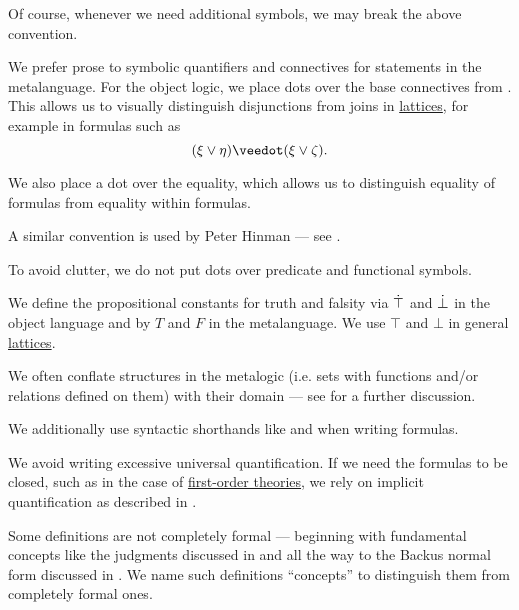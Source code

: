\begin{remark}
\begin{thmenum}
    Of course, whenever we need additional symbols, we may break the above convention.

     We prefer prose to symbolic quantifiers and connectives for statements in the metalanguage. For the object logic, we place dots over the base connectives from . This allows us to visually distinguish disjunctions from joins in \hyperref[def:lattice]{lattices}, for example in formulas such as
    \begin{equation*}
      (\xi \vee \eta) \synvee (\xi \vee \zeta).
    \end{equation*}

    We also place a dot over the equality, which allows us to distinguish equality of formulas from equality within formulas.

    A similar convention is used by Peter Hinman --- see \cite[rem. 2.1.3]{Hinman2005}.

    To avoid clutter, we do not put dots over predicate and functional symbols.

     We define the propositional constants for truth and falsity via \( \dot\top \) and \( \dot\bot \) in the object language and by \( T \) and \( F \) in the metalanguage. We use \( \top \) and \( \bot \) in general \hyperref[def:lattice]{lattices}.

     We often conflate structures in the metalogic (i.e. sets with functions and/or relations defined on them) with their domain --- see  for a further discussion.

     We additionally use syntactic shorthands like  and  when writing formulas.

     We avoid writing excessive universal quantification. If we need the formulas to be closed, such as in the case of \hyperref[def:first_order_theory]{first-order theories}, we rely on implicit quantification as described in .

     Some definitions are not completely formal --- beginning with fundamental concepts like the judgments discussed in  and all the way to the Backus normal form discussed in . We name such definitions \enquote{concepts} to distinguish them from completely formal ones.
  \end{thmenum}
\end{remark}
